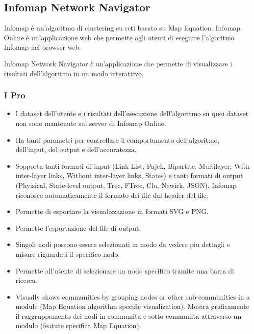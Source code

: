 \documentclass[a4paper,12pt]{report}
\begin{document}
		\subsection{Infomap Network Navigator}
		Infomap è un'algoritmo di clustering su reti basato su Map Equation. Infomap Online è un'applicazione web che permette agli utenti di eseguire
		l'algoritmo Infomap nel browser web. \cite{mapequationsite} 
		
		Infomap Network Navigator è un'applicazione che permette di visualizzare i risultati
		dell'algoritmo in un modo interattivo. \cite{mapequationnavigatorsite} 
		
			\subsubsection*{I Pro}
				\begin{itemize}
					\item I dataset dell'utente e i risultati dell'esecuzione dell'algoritmo su quei dataset non sono mantenute sul server di Infomap Online.
					\item Ha tanti parametri per controllare il comportamento dell'algoritmo, dell'input, del output e dell'accuratezza.
					\item Sopporta tanti formati di input (Link-List, Pajek, Bipartite, Multilayer, With inter-layer links, Without inter-layer links, States) e tanti formati di output (Phyisical, State-level output, Tree, FTree, Clu, Newick, JSON). Infomap riconosce automaticamente il formato dei file dal header del file.
					\item Permette di esportare la visualizzazione in formati SVG e PNG.
					\item Permette l'esportazione del file di output.
					\item Singoli nodi possono essere selezionati in modo da vedere piu dettagli e misure riguardati il specifico nodo.
					\item Permette all'utente di selezionare un nodo specifico tramite una barra di ricerca.
					\item Visually shows communities by grouping nodes or other sub-communities in a module (Map Equation algorithm specific visualization). Mostra graficamente il raggruppamento dei nodi in communita e sotto-communita attraverso un modulo (feature specifica Map Equation).
				\end{itemize}			
\end{document}

